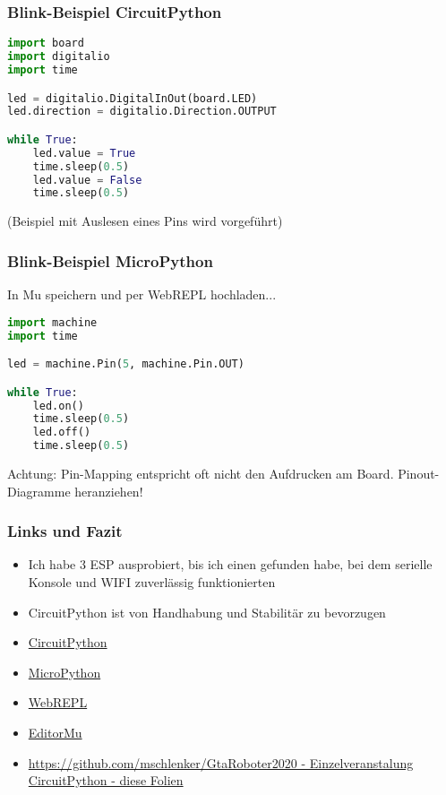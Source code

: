 \documentclass{beamer}
\begin{document}
\begin{frame}[fragile]

\frametitle{Blink-Beispiel CircuitPython}

\begin{lstlisting}[language=Python] 
import board
import digitalio
import time

led = digitalio.DigitalInOut(board.LED)
led.direction = digitalio.Direction.OUTPUT

while True:
    led.value = True
    time.sleep(0.5)
    led.value = False
    time.sleep(0.5)

\end{lstlisting} 

(Beispiel mit Auslesen eines Pins wird vorgeführt)

\end{frame}

\begin{frame}[fragile]

\frametitle{Blink-Beispiel MicroPython}

In Mu speichern und per WebREPL hochladen...

\begin{lstlisting}[language=Python] 
import machine
import time

led = machine.Pin(5, machine.Pin.OUT)

while True:
    led.on()
    time.sleep(0.5)
    led.off()
    time.sleep(0.5)

\end{lstlisting} 

Achtung: Pin-Mapping entspricht oft nicht den Aufdrucken am Board. Pinout-Diagramme heranziehen!

\end{frame}

\begin{frame}[fragile]
\frametitle{Links und Fazit}

\begin{itemize}
\item Ich habe 3 ESP ausprobiert, bis ich einen gefunden habe, bei dem serielle Konsole und WIFI zuverlässig funktionierten
\item CircuitPython ist von Handhabung und Stabilitär zu bevorzugen
\item \href{https://circuitpython.org}{CircuitPython}
\item \href{https://micropython.org}{MicroPython}
\item \href{http://micropython.org/webrepl/}{WebREPL}
\item \href{https://codewith.mu/}{EditorMu}
\item \href{https://github.com/mschlenker/GtaRoboter2020/tree/master/Einzelveranstaltung\_Circuitpython}{https://github.com/mschlenker/GtaRoboter2020 - Einzelveranstalung CircuitPython - diese Folien}
\end{itemize}

\end{frame}
\end{document}
